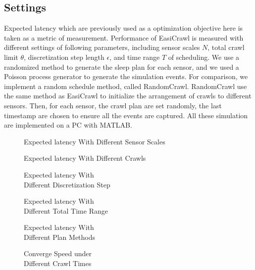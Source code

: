 \documentclass[conference]{IEEEtran}
\begin{document}
\subsection{Settings}
Expected latency which are previously used as a optimization objective here is taken as a metric of measurement.
Performance of EasiCrawl is measured with different settings of following parameters, including sensor scales $N$, total crawl limit $\theta$, discretization step length $\epsilon$, and time range $T$ of scheduling. 
We use a randomized method to generate the sleep plan for each sensor, and we used a Poisson process generator to generate the simulation events.
For comparison, we implement a random schedule method, called RandomCrawl. 
RandomCrawl use the same method as EasiCrawl to initialize the arrangement of crawls to different sensors. 
Then, for each sensor, the crawl plan are set randomly, the last timestamp are chosen to ensure all the events are captured. 
All these simulation are implemented on a PC with MATLAB.
\begin{figure*}
		
		\captionsetup{justification=centering}
		\caption{Expected latency With Different Sensor Scales}
		\label{fig:test1_sensorscale}
	\endminipage\hfill
		
		\captionsetup{justification=centering}
		\caption{Expected latency With Different Crawls}
		\label{fig:test2_totalcrawl}
	\endminipage\hfill
		
		\captionsetup{justification=centering}
		\caption{Expected latency With \\Different Discretization Step}
		\label{fig:test3_discretestep}
	\endminipage
	
		
		\captionsetup{justification=centering}
		\caption{Expected latency With \\Different Total Time Range}
		\label{fig:test4_timerange}
	\endminipage\hfill
		
		\captionsetup{justification=centering}
		\caption{Expected latency With \\Different Plan Methods}
		\label{fig:test5_sensortype}
	\endminipage\hfill
		
		\captionsetup{justification=centering}
		\caption{Converge Speed under \\Different Crawl Times}
		\label{fig:test6_convergespeed}
	\endminipage	
\end{figure*}
\end{document}
